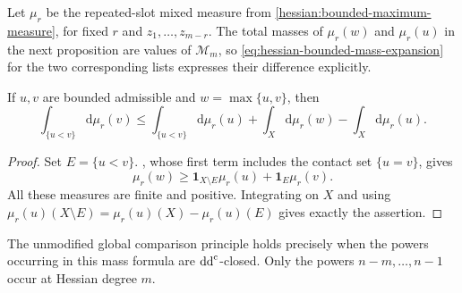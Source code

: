 Let $\mu_r$ be the repeated-slot mixed measure from
\cref{hessian:bounded-maximum-measure}, for fixed $r$ and
$z_1,\ldots,z_{m-r}$.
The total masses of $\mu_r(w)$ and $\mu_r(u)$ in the next proposition
are values of $\mathcal M_m$, so
\eqref{eq:hessian-bounded-mass-expansion} for the two corresponding
lists expresses their difference explicitly.

\begin{proposition}\label{hessian:comparison-mass-defect}
If $u,v$ are bounded admissible and $w=\max\{u,v\}$, then
\[
 \int_{\{u<v\}}\mathrm d\mu_r(v)
 \leq\int_{\{u<v\}}\mathrm d\mu_r(u)
                +\int_X\mathrm d\mu_r(w)-\int_X\mathrm d\mu_r(u).
\]
\end{proposition}
\begin{proof}
Set $E=\{u<v\}$. , whose
first term includes the contact set $\{u=v\}$, gives
\[
 \mu_r(w)\geq\mathbf1_{X\setminus E}\mu_r(u)
                     +\mathbf1_E\mu_r(v).
\]
All these measures are finite and positive. Integrating on $X$ and
using $\mu_r(u)(X\setminus E)=\mu_r(u)(X)-\mu_r(u)(E)$ gives
exactly the assertion.
\end{proof}

The unmodified global comparison principle holds precisely when the
powers occurring in this mass formula are $\mathrm{dd}^{\mathrm{c}}$-closed. Only the
powers $n-m,\ldots,n-1$ occur at Hessian degree $m$.


